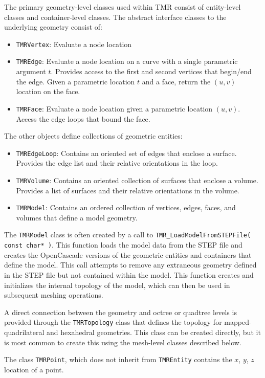 \documentclass[12pt]{article}
\begin{document}
The primary geometry-level classes used within TMR consist of entity-level classes and container-level classes. The abstract interface classes to the underlying geometry consist of:
\begin{itemize}
\item \texttt{TMRVertex}: Evaluate a node location
\item \texttt{TMREdge}: Evaluate a node location on a curve with a single parametric argument $t$. Provides access to the first and second vertices that begin/end the edge. Given a parametric location $t$ and a face, return the $(u,v)$ location on the face.
\item \texttt{TMRFace}: Evaluate a node location given a parametric location $(u,v)$. Access the edge loops that bound the face.
\end{itemize}

The other objects define collections of geometric entities:
%
\begin{itemize}
\item \texttt{TMREdgeLoop}: Contains an oriented set of edges that enclose a surface. Provides the edge list and their relative orientations in the loop.
\item \texttt{TMRVolume}: Contains an oriented collection of surfaces that enclose a volume. Provides a list of surfaces and their relative orientations in the volume.
\item \texttt{TMRModel}: Contains an ordered collection of vertices, edges, faces, and volumes that define a model geometry.
\end{itemize}

The \texttt{TMRModel} class is often created by a call to \texttt{TMR\_LoadModelFromSTEPFile( const char* )}. 
This function loads the model data from the STEP file and creates the OpenCascade versions of the geometric entities and containers that define the model.
This call attempts to remove any extraneous geometry defined in the STEP file but not contained within the model.
This function creates and initializes the internal topology of the model, which can then be used in subsequent meshing operations.

A direct connection between the geometry and octree or quadtree levels is provided through the \texttt{TMRTopology} class that defines the topology for mapped-quadrilateral and hexahedral geometries. 
This class can be created directly, but it is most common to create this using the mesh-level classes described below.

The class \texttt{TMRPoint}, which does not inherit from \texttt{TMREntity} contains the $x$, $y$, $z$ location of a point.
\end{document}
